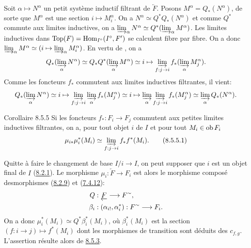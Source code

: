 \documentclass[10pt]{../fichiers-configuration-latex/smfart}
\begin{document}
Soit $\alpha \mapsto N^{\alpha}$ un petit système inductif filtrant de
$\underleftarrow{F}$. Posons $M^{\alpha} = Q_{\ast} (N^{\alpha})$, de
sorte que $M^{\alpha}$ est une section $i \mapsto M^{\alpha}_i$. On a
$N^{\alpha} \simeq Q^{\ast} Q_{\ast} (N^{\alpha})$ et comme $Q^{\ast}$
commute aux limites inductives, on a
$\varinjlim_{\alpha}{N^{\alpha}}\simeq Q^{\ast}
(\varinjlim_{\alpha}{M^{\alpha}})$. Les limites
inductives dans $\operatorname{Top}(F) = \operatorname{Hom}_{I^{\circ}}(I^{\circ}, F')$ se
calculent fibre par
fibre. On a donc $\varinjlim_{\alpha} {M^{\alpha}} \simeq
(i \mapsto \varinjlim_{\alpha}
{M^{\alpha}_{i}})$. En vertu de , on a
$$
Q_{\ast} (\varinjlim_{\alpha} {N}^{\alpha}) \simeq Q_{\ast}
Q^{\ast} (\varinjlim_{\alpha} {M}^{\alpha}) \simeq i \mapsto
\varinjlim_{f : j \to i} f_{\ast}
(\varinjlim_{\alpha} {M}^{\alpha}_j){\quoi}.
$$
Comme les foncteurs $f_{\ast}$ commutent aux limites inductives
filtrantes, il vient:
$$
Q_{\ast} (\varinjlim_{\alpha} {N}^{\alpha}) \simeq i \mapsto
\varinjlim_{f: j\to i} \varinjlim_{\alpha} f_{\ast}
(M^{\alpha}_j) \simeq i \mapsto \varinjlim_{\alpha} \varinjlim_{f:
  j\to i} f_{\ast}
(M^{\alpha}_j) \simeq \varinjlim_{\alpha} Q_{\ast} (N^{\alpha}){\quoi}.
$$

\begin{enonce*}{Corollaire 8.5.5}
Si les foncteurs $f_{\ast} : F_{i} \to F_{j}$ commutent aux petites
limites inductives filtrantes, on a, pour tout objet $i$ de $I$ et
pour tout $M_i \in \operatorname{ob} F_i$
\begin{equation*}
\mu_{i\ast} \mu_{i}^{\ast} (M_i) \simeq \varinjlim_{f : j \to
      i} f_{\ast} f^{\ast}(M_i){\quoi}.\tag{8.5.5.1}
\end{equation*}
\end{enonce*}
\noindent
Quitte à faire le changement de base $I/i \to I$, on peut supposer que
$i$ est un objet final de $I$ (\hyperref[VI.lem8.2.1]{8.2.1}). Le morphisme $\mu_{i} :
\underleftarrow{F} \to F_i$ est alors le morphisme composé
des\pageoriginale morphismes (\hyperref[VI.thm8.2.9]{8.2.9}) et (\hyperref[VI.lem7.4.12]{7.4.12}):
\begin{align*}
Q &: \underleftarrow{F} \to F^{\sim}{\quoi},\\
\beta_i &: (\alpha_{i!}, \alpha^{\ast}_i) : F^{\sim} \to F_i{\quoi}.
\end{align*}
On a donc $\mu_i^{\ast} (M_i) \simeq Q^{\ast} \beta_i^{\ast} (M_i)$,
où $\beta_i^{\ast} (M_i)$ est la section $(f : i \to j) \mapsto
f^{\ast}(M_i)$ dont les morphismes de transition sont déduits des
$c_{f,g}$. L'assertion résulte alors de \hyperref[VI.prop8.5.3]{8.5.3}.
\end{document}
